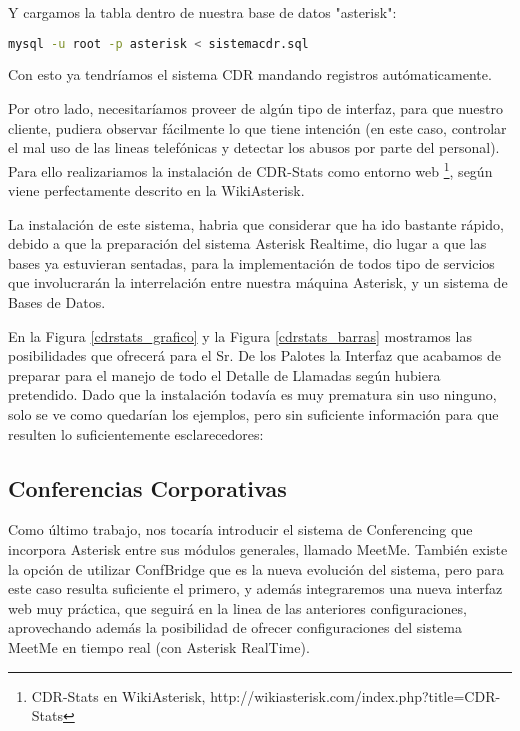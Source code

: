 Y cargamos la tabla dentro de nuestra base de datos "asterisk":

\begin{lstlisting}[language=sh]
mysql -u root -p asterisk < sistemacdr.sql
\end{lstlisting}

Con esto ya tendríamos el sistema CDR mandando registros autómaticamente.

Por otro lado, necesitaríamos proveer de algún tipo de interfaz, para que nuestro cliente, pudiera observar fácilmente lo que tiene intención (en este caso, controlar el mal uso de las lineas telefónicas y detectar los abusos por parte del personal). Para ello realizariamos la instalación de CDR-Stats como entorno web \footnote{CDR-Stats en WikiAsterisk, http://wikiasterisk.com/index.php?title=CDR-Stats}, según viene perfectamente descrito en la WikiAsterisk.

La instalación de este sistema, habria que considerar que ha ido bastante rápido, debido a que la preparación del sistema Asterisk Realtime, dio lugar a que las bases ya estuvieran sentadas, para la implementación de todos tipo de servicios que involucrarán la interrelación entre nuestra máquina Asterisk, y un sistema de Bases de Datos.

En la Figura \ref{cdrstats_grafico} y la Figura \ref{cdrstats_barras} mostramos las posibilidades que ofrecerá para el Sr. De los Palotes la Interfaz que acabamos de preparar para el manejo de todo el Detalle de Llamadas según hubiera pretendido. Dado que la instalación todavía es muy prematura sin uso ninguno, solo se ve como quedarían los ejemplos, pero sin suficiente información para que resulten lo suficientemente esclarecedores:



\newpage

\subsection{Conferencias Corporativas}

Como último trabajo, nos tocaría introducir el sistema de Conferencing que incorpora Asterisk entre sus módulos generales, llamado MeetMe. También existe la opción de utilizar ConfBridge que es la nueva evolución del sistema, pero para este caso resulta suficiente el primero, y además integraremos una nueva interfaz web muy práctica, que seguirá en la linea de las anteriores configuraciones, aprovechando además la posibilidad de ofrecer configuraciones del sistema MeetMe en tiempo real (con Asterisk RealTime).

